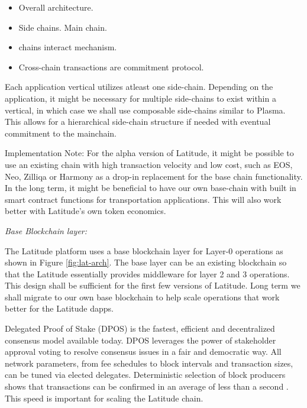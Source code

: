 \begin{itemize}
    \item Overall architecture.
    \item Side chains. Main chain.
    \item chains interact mechanism.
    \item Cross-chain transactions are commitment protocol.

\end{itemize}

Each application vertical utilizes atleast one side-chain. Depending on the application, it might be necessary for
multiple side-chains to exist within a vertical, in which case we shall use composable side-chains similar to Plasma.
This allows for a hierarchical side-chain structure if needed with eventual commitment to the mainchain.

Implementation Note: For the alpha version of Latitude, it might be possible to use an existing chain with high
transaction velocity and low cost, such as EOS, Neo, Zilliqa or Harmony as a drop-in replacement for the base chain
functionality. In the long term, it might be beneficial to have our own base-chain with built in smart contract
functions for transportation applications. This will also work better with Latitude's own token economics.

\noindent
{\em Base Blockchain layer:}

The Latitude platform uses a base blockchain layer for Layer-0 operations as shown in Figure \ref{fig:lat-arch}. The
base layer can be an existing blockchain so that the Latitude essentially provides middleware for layer 2 and 3
operations. This design shall be sufficient for the first few versions of Latitude. Long term we shall migrate to our
own base blockchain to help scale operations that work better for the Latitude dapps.

Delegated Proof of Stake (DPOS) is the fastest, efficient and decentralized consensus model available today. DPOS
leverages the power of stakeholder approval voting to resolve consensus issues in a fair and democratic way. All network
parameters, from fee schedules to block intervals and transaction sizes, can be tuned via elected delegates.
Deterministic selection of block producers shows that transactions can be confirmed in an average of less than a second
\cite{eos_producers}. This speed is important for scaling the Latitude chain.

